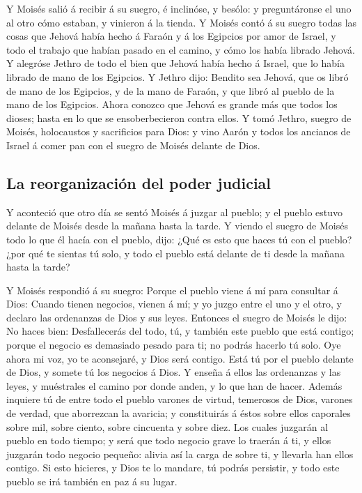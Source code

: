  Y Moisés salió á recibir á su suegro, é inclinóse, y
besólo: y preguntáronse el uno al otro cómo estaban, y vinieron á la
tienda.  Y Moisés contó á su suegro todas las cosas que
Jehová había hecho á Faraón y á los Egipcios por amor de Israel, y todo
el trabajo que habían pasado en el camino, y cómo los había librado
Jehová.  Y alegróse Jethro de todo el bien que Jehová
había hecho á Israel, que lo había librado de mano de los Egipcios.
 Y Jethro dijo: Bendito sea Jehová, que os libró de mano
de los Egipcios, y de la mano de Faraón, y que libró al pueblo de la
mano de los Egipcios.  Ahora conozco que Jehová es grande
más que todos los dioses; hasta en lo que se ensoberbecieron contra
ellos.  Y tomó Jethro, suegro de Moisés, holocaustos y
sacrificios para Dios: y vino Aarón y todos los ancianos de Israel á
comer pan con el suegro de Moisés delante de Dios.

\hypertarget{la-reorganizaciuxf3n-del-poder-judicial}{%
\subsection{La reorganización del poder
judicial}\label{la-reorganizaciuxf3n-del-poder-judicial}}

 Y aconteció que otro día se sentó Moisés á juzgar al
pueblo; y el pueblo estuvo delante de Moisés desde la mañana hasta la
tarde.  Y viendo el suegro de Moisés todo lo que él hacía
con el pueblo, dijo: ¿Qué es esto que haces tú con el pueblo? ¿por qué
te sientas tú solo, y todo el pueblo está delante de ti desde la mañana
hasta la tarde?

 Y Moisés respondió á su suegro: Porque el pueblo viene á
mí para consultar á Dios:  Cuando tienen negocios, vienen
á mí; y yo juzgo entre el uno y el otro, y declaro las ordenanzas de
Dios y sus leyes.  Entonces el suegro de Moisés le dijo:
No haces bien:  Desfallecerás del todo, tú, y también
este pueblo que está contigo; porque el negocio es demasiado pesado para
ti; no podrás hacerlo tú solo.  Oye ahora mi voz, yo te
aconsejaré, y Dios será contigo. Está tú por el pueblo delante de Dios,
y somete tú los negocios á Dios.  Y enseña á ellos las
ordenanzas y las leyes, y muéstrales el camino por donde anden, y lo que
han de hacer.  Además inquiere tú de entre todo el pueblo
varones de virtud, temerosos de Dios, varones de verdad, que aborrezcan
la avaricia; y constituirás á éstos sobre ellos caporales sobre mil,
sobre ciento, sobre cincuenta y sobre diez.  Los cuales
juzgarán al pueblo en todo tiempo; y será que todo negocio grave lo
traerán á ti, y ellos juzgarán todo negocio pequeño: alivia así la carga
de sobre ti, y llevarla han ellos contigo.  Si esto
hicieres, y Dios te lo mandare, tú podrás persistir, y todo este pueblo
se irá también en paz á su lugar.

